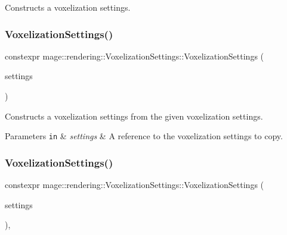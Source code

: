 Constructs a voxelization settings. \hypertarget{classmage_1_1rendering_1_1_voxelization_settings_a62f8755e86da892cd22467309fecfe95}{}\label{classmage_1_1rendering_1_1_voxelization_settings_a62f8755e86da892cd22467309fecfe95} 
\subsubsection{\texorpdfstring{Voxelization\+Settings()}{VoxelizationSettings()}\hspace{0.1cm}{\footnotesize\ttfamily [2/3]}}
{\footnotesize\ttfamily constexpr mage\+::rendering\+::\+Voxelization\+Settings\+::\+Voxelization\+Settings (\begin{DoxyParamCaption}\item[{const \hyperlink{classmage_1_1rendering_1_1_voxelization_settings}{Voxelization\+Settings} \&}]{settings }\end{DoxyParamCaption})\hspace{0.3cm}{\ttfamily [default]}}

Constructs a voxelization settings from the given voxelization settings.


\begin{DoxyParams}[1]{Parameters}
\mbox{\tt in}  & {\em settings} & A reference to the voxelization settings to copy. \\
\hline
\end{DoxyParams}
\hypertarget{classmage_1_1rendering_1_1_voxelization_settings_af706582ce61228cd994aa72c537aa020}{}\label{classmage_1_1rendering_1_1_voxelization_settings_af706582ce61228cd994aa72c537aa020} 
\subsubsection{\texorpdfstring{Voxelization\+Settings()}{VoxelizationSettings()}\hspace{0.1cm}{\footnotesize\ttfamily [3/3]}}
{\footnotesize\ttfamily constexpr mage\+::rendering\+::\+Voxelization\+Settings\+::\+Voxelization\+Settings (\begin{DoxyParamCaption}\item[{\hyperlink{classmage_1_1rendering_1_1_voxelization_settings}{Voxelization\+Settings} \&\&}]{settings }\end{DoxyParamCaption})\hspace{0.3cm}{\ttfamily [default]}, {\ttfamily [noexcept]}}

